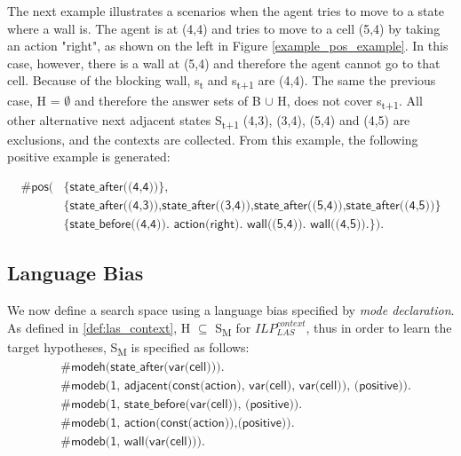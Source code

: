 \begin{examp}
The next example illustrates a scenarios when the agent tries to move to a state where a wall is. 
The agent is at (4,4) and tries to move to a cell (5,4) by taking an action "right", as shown on the left in Figure \ref{example_pos_example}. 
In this case, however, there is a wall at (5,4) and therefore the agent cannot go to that cell.
Because of the blocking wall, s\textsubscript{t} and s\textsubscript{t+1} are (4,4).
The same the previous case, H = $\emptyset$ and therefore the answer sets of B $\cup$ H, does not cover s\textsubscript{t+1}.
All other alternative next adjacent states S\textsubscript{t+1} (4,3), (3,4), (5,4) and (4,5) are exclusions, and the contexts are collected.
From this example, the following positive example is generated:

\begin{equation}
\begin{split}
\textsf{\#pos(} & \textsf{\{state\_after((4,4))\}}, \\
                & \textsf{\{state\_after((4,3)),state\_after((3,4)),state\_after((5,4)),state\_after((4,5))\}} \\
                & \textsf{\{state\_before((4,4)). action(right). wall((5,4)). wall((4,5)).\}).}
\end{split}
\end{equation}

\end{examp}
\label{state_transition_example}

\subsection{Language Bias}
\label{subsec:language_bias}
We now define a search space using a language bias specified by \textit{mode declaration}.
As defined in \ref{def:las_context}, H $\subseteq$ S\textsubscript{M} for $ILP_{LAS}^{context}$, thus in order to learn the target hypotheses, S\textsubscript{M} is specified as follows:
\begin{equation} \label{eq:sm}
\begin{split}
&\textsf{\#modeh(state\_after(var(cell))).}\\
&\textsf{\#modeb(1, adjacent(const(action), var(cell), var(cell)), (positive)).} \\
&\textsf{\#modeb(1, state\_before(var(cell)), (positive)).} \\
&\textsf{\#modeb(1, action(const(action)),(positive)).} \\
&\textsf{\#modeb(1, wall(var(cell))).} \\
\end{split}
\end{equation}

